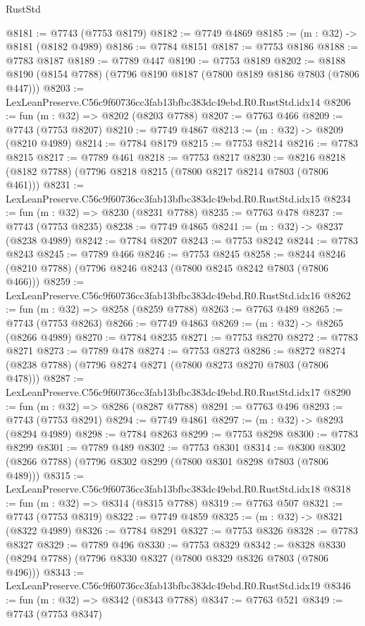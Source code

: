 \begin{lexlean}{RustStd}
\begin{coremodule}
@8181 := @7743 (@7753 @8179)
@8182 := @7749 @4869
@8185 := (m : @32) -> @8181 (@8182 @4989)
@8186 := @7784 @8151
@8187 := @7753 @8186
@8188 := @7783 @8187
@8189 := @7789 @447
@8190 := @7753 @8189
@8202 := @8188 @8190 (@8154 @7788) (@7796 @8190 @8187 (@7800 @8189 @8186 @7803 (@7806 @447)))
@8203 := LexLeanPreserve.C56c9f60736cc3fab13bfbc383dc49ebd.R0.RustStd.idx14
@8206 := fun (m : @32) => @8202 (@8203 @7788)
@8207 := @7763 @466
@8209 := @7743 (@7753 @8207)
@8210 := @7749 @4867
@8213 := (m : @32) -> @8209 (@8210 @4989)
@8214 := @7784 @8179
@8215 := @7753 @8214
@8216 := @7783 @8215
@8217 := @7789 @461
@8218 := @7753 @8217
@8230 := @8216 @8218 (@8182 @7788) (@7796 @8218 @8215 (@7800 @8217 @8214 @7803 (@7806 @461)))
@8231 := LexLeanPreserve.C56c9f60736cc3fab13bfbc383dc49ebd.R0.RustStd.idx15
@8234 := fun (m : @32) => @8230 (@8231 @7788)
@8235 := @7763 @478
@8237 := @7743 (@7753 @8235)
@8238 := @7749 @4865
@8241 := (m : @32) -> @8237 (@8238 @4989)
@8242 := @7784 @8207
@8243 := @7753 @8242
@8244 := @7783 @8243
@8245 := @7789 @466
@8246 := @7753 @8245
@8258 := @8244 @8246 (@8210 @7788) (@7796 @8246 @8243 (@7800 @8245 @8242 @7803 (@7806 @466)))
@8259 := LexLeanPreserve.C56c9f60736cc3fab13bfbc383dc49ebd.R0.RustStd.idx16
@8262 := fun (m : @32) => @8258 (@8259 @7788)
@8263 := @7763 @489
@8265 := @7743 (@7753 @8263)
@8266 := @7749 @4863
@8269 := (m : @32) -> @8265 (@8266 @4989)
@8270 := @7784 @8235
@8271 := @7753 @8270
@8272 := @7783 @8271
@8273 := @7789 @478
@8274 := @7753 @8273
@8286 := @8272 @8274 (@8238 @7788) (@7796 @8274 @8271 (@7800 @8273 @8270 @7803 (@7806 @478)))
@8287 := LexLeanPreserve.C56c9f60736cc3fab13bfbc383dc49ebd.R0.RustStd.idx17
@8290 := fun (m : @32) => @8286 (@8287 @7788)
@8291 := @7763 @496
@8293 := @7743 (@7753 @8291)
@8294 := @7749 @4861
@8297 := (m : @32) -> @8293 (@8294 @4989)
@8298 := @7784 @8263
@8299 := @7753 @8298
@8300 := @7783 @8299
@8301 := @7789 @489
@8302 := @7753 @8301
@8314 := @8300 @8302 (@8266 @7788) (@7796 @8302 @8299 (@7800 @8301 @8298 @7803 (@7806 @489)))
@8315 := LexLeanPreserve.C56c9f60736cc3fab13bfbc383dc49ebd.R0.RustStd.idx18
@8318 := fun (m : @32) => @8314 (@8315 @7788)
@8319 := @7763 @507
@8321 := @7743 (@7753 @8319)
@8322 := @7749 @4859
@8325 := (m : @32) -> @8321 (@8322 @4989)
@8326 := @7784 @8291
@8327 := @7753 @8326
@8328 := @7783 @8327
@8329 := @7789 @496
@8330 := @7753 @8329
@8342 := @8328 @8330 (@8294 @7788) (@7796 @8330 @8327 (@7800 @8329 @8326 @7803 (@7806 @496)))
@8343 := LexLeanPreserve.C56c9f60736cc3fab13bfbc383dc49ebd.R0.RustStd.idx19
@8346 := fun (m : @32) => @8342 (@8343 @7788)
@8347 := @7763 @521
@8349 := @7743 (@7753 @8347)

\end{coremodule}
\end{lexlean}
